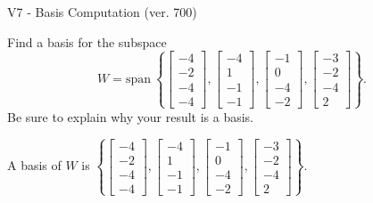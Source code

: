\begin{exercise}
  \begin{exerciseTitle}V7 - Basis Computation (ver. 700)\end{exerciseTitle}
  \begin{exerciseStatement}
    Find a basis for the subspace 
\[W=\mathrm{span}\ \left\{\left[\begin{array}{r}
-4 \\
-2 \\
-4 \\
-4
\end{array}\right] , \left[\begin{array}{r}
-4 \\
1 \\
-1 \\
-1
\end{array}\right] , \left[\begin{array}{r}
-1 \\
0 \\
-4 \\
-2
\end{array}\right] , \left[\begin{array}{r}
-3 \\
-2 \\
-4 \\
2
\end{array}\right]\right\}.\]
 Be sure to explain why your result is a basis.


  \end{exerciseStatement}
  \begin{exerciseAnswer}
   A basis of \(W\) is  \(\left\{\left[\begin{array}{r}
-4 \\
-2 \\
-4 \\
-4
\end{array}\right] , \left[\begin{array}{r}
-4 \\
1 \\
-1 \\
-1
\end{array}\right] , \left[\begin{array}{r}
-1 \\
0 \\
-4 \\
-2
\end{array}\right] , \left[\begin{array}{r}
-3 \\
-2 \\
-4 \\
2
\end{array}\right]\right\}\).
  


  \end{exerciseAnswer}
\end{exercise}